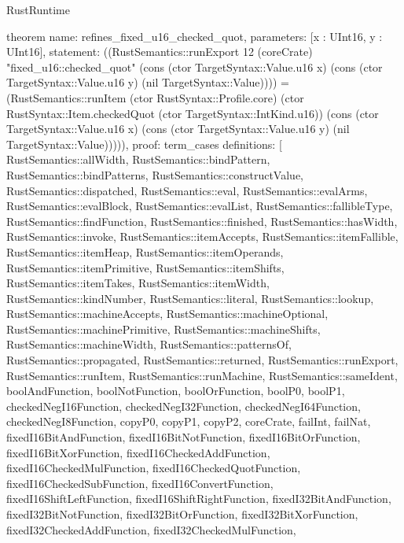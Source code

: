\begin{lexlean}{RustRuntime}
\begin{semanticmodule}
theorem{
  name: refines_fixed_u16_checked_quot,
  parameters: [x : UInt16, y : UInt16],
  statement: ((RustSemantics::runExport 12 (coreCrate) "fixed_u16::checked_quot" (cons (ctor TargetSyntax::Value.u16 x) (cons (ctor TargetSyntax::Value.u16 y) (nil TargetSyntax::Value)))) = (RustSemantics::runItem (ctor RustSyntax::Profile.core) (ctor RustSyntax::Item.checkedQuot (ctor TargetSyntax::IntKind.u16)) (cons (ctor TargetSyntax::Value.u16 x) (cons (ctor TargetSyntax::Value.u16 y) (nil TargetSyntax::Value))))),
  proof: term_cases{
    definitions: [
      RustSemantics::allWidth,
      RustSemantics::bindPattern,
      RustSemantics::bindPatterns,
      RustSemantics::constructValue,
      RustSemantics::dispatched,
      RustSemantics::eval,
      RustSemantics::evalArms,
      RustSemantics::evalBlock,
      RustSemantics::evalList,
      RustSemantics::fallibleType,
      RustSemantics::findFunction,
      RustSemantics::finished,
      RustSemantics::hasWidth,
      RustSemantics::invoke,
      RustSemantics::itemAccepts,
      RustSemantics::itemFallible,
      RustSemantics::itemHeap,
      RustSemantics::itemOperands,
      RustSemantics::itemPrimitive,
      RustSemantics::itemShifts,
      RustSemantics::itemTakes,
      RustSemantics::itemWidth,
      RustSemantics::kindNumber,
      RustSemantics::literal,
      RustSemantics::lookup,
      RustSemantics::machineAccepts,
      RustSemantics::machineOptional,
      RustSemantics::machinePrimitive,
      RustSemantics::machineShifts,
      RustSemantics::machineWidth,
      RustSemantics::patternsOf,
      RustSemantics::propagated,
      RustSemantics::returned,
      RustSemantics::runExport,
      RustSemantics::runItem,
      RustSemantics::runMachine,
      RustSemantics::sameIdent,
      boolAndFunction,
      boolNotFunction,
      boolOrFunction,
      boolP0,
      boolP1,
      checkedNegI16Function,
      checkedNegI32Function,
      checkedNegI64Function,
      checkedNegI8Function,
      copyP0,
      copyP1,
      copyP2,
      coreCrate,
      failInt,
      failNat,
      fixedI16BitAndFunction,
      fixedI16BitNotFunction,
      fixedI16BitOrFunction,
      fixedI16BitXorFunction,
      fixedI16CheckedAddFunction,
      fixedI16CheckedMulFunction,
      fixedI16CheckedQuotFunction,
      fixedI16CheckedSubFunction,
      fixedI16ConvertFunction,
      fixedI16ShiftLeftFunction,
      fixedI16ShiftRightFunction,
      fixedI32BitAndFunction,
      fixedI32BitNotFunction,
      fixedI32BitOrFunction,
      fixedI32BitXorFunction,
      fixedI32CheckedAddFunction,
      fixedI32CheckedMulFunction,
}}
\end{semanticmodule}
\end{lexlean}
